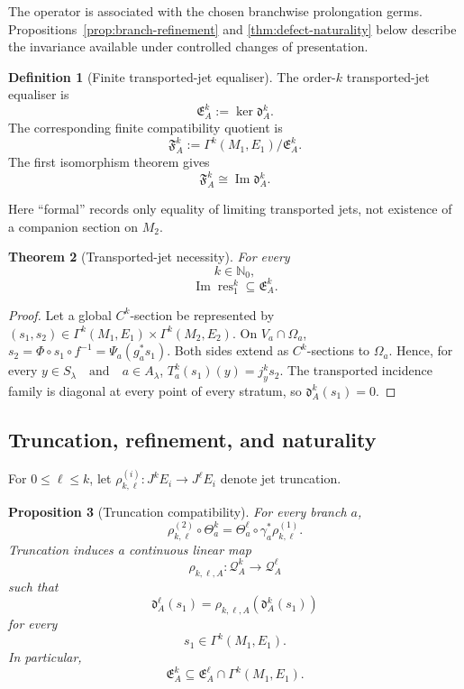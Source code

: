 \documentclass[11pt]{article}
\theoremstyle{plain}
\newtheorem{theorem}{Theorem}[section]
\newtheorem{proposition}[theorem]{Proposition}
\theoremstyle{definition}
\newtheorem{definition}[theorem]{Definition}
\begin{document}
The operator is associated with the chosen branchwise prolongation
germs. Propositions~\ref{prop:branch-refinement} and
\ref{thm:defect-naturality} below describe the invariance available
under controlled changes of presentation.

\begin{definition}[Finite transported-jet equaliser]
\label{def:formal-equaliser}
The order-\(k\) transported-jet equaliser is
\[
  \mathfrak E_A^k
  :=
  \ker\mathfrak d_A^k.
\]
The corresponding finite compatibility quotient is
\[
  \mathfrak F_A^k
  :=
  \Gamma^k(M_1,E_1)/\mathfrak E_A^k.
\]
The first isomorphism theorem gives
\[
  \mathfrak F_A^k
  \cong
  \operatorname{Im}\mathfrak d_A^k.
\]
\end{definition}

Here ``formal'' records only equality of limiting transported jets, not existence of a companion section on \(M_2\).

\begin{theorem}[Transported-jet necessity]
\label{thm:universal-jet-obstruction}
For every
\[
  k\in\mathbb N_0,
\]
\[
  \operatorname{Im}\operatorname{res}_1^k
  \subseteq
  \mathfrak E_A^k.
\]
\end{theorem}

\begin{proof}
Let a global \(C^k\)-section be represented by
\((s_1,s_2) \in \Gamma^k(M_1,E_1) \times \Gamma^k(M_2,E_2)\).
On \(V_a\cap\Omega_a\),
\(s_2 = \Phi\circ s_1\circ f^{-1} = \Psi_a(g_a^*s_1)\).
Both sides extend as \(C^k\)-sections to \(\Omega_a\). Hence, for
every
\(y\in S_\lambda \quad\text{and}\quad a\in A_\lambda\),
\(T_a^k(s_1)(y) = j_y^k s_2\).
The transported incidence family is diagonal at every point of every
stratum, so
\(\mathfrak d_A^k(s_1)=0\).
\end{proof}

\subsection{Truncation, refinement, and naturality}
\label{subsec:truncation-naturality}

For
\(0\leq\ell\leq k\),
let \(\rho_{k,\ell}^{(i)}: J^kE_i \longrightarrow J^\ell E_i\) denote jet truncation.

\begin{proposition}[Truncation compatibility]
\label{prop:defect-truncation}
For every branch \(a\),
\[
  \rho_{k,\ell}^{(2)}
  \circ
  \Theta_a^k
  =
  \Theta_a^\ell
  \circ
  \gamma_a^*\rho_{k,\ell}^{(1)}.
\]
Truncation induces a continuous linear map
\[
  \rho_{k,\ell,A}:
  \mathcal Q_A^k
  \longrightarrow
  \mathcal Q_A^\ell
\]
such that
\[
  \mathfrak d_A^\ell(s_1)
  =
  \rho_{k,\ell,A}
  \left(
    \mathfrak d_A^k(s_1)
  \right)
\]
for every
\[
  s_1\in\Gamma^k(M_1,E_1).
\]
In particular,
\[
  \mathfrak E_A^k
  \subseteq
  \mathfrak E_A^\ell
  \cap
  \Gamma^k(M_1,E_1).
\]
\end{proposition}
\end{document}
